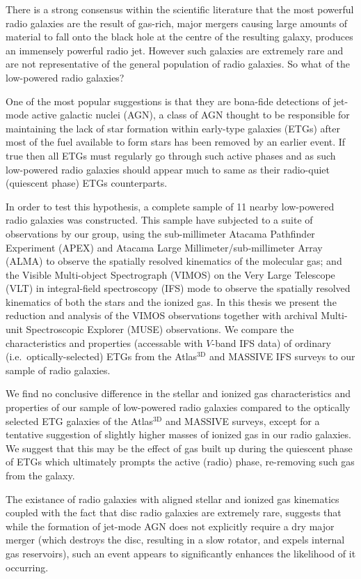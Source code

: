 \begin{abstractlong}
There is a strong consensus within the scientific literature that the most powerful radio galaxies are the result of gas-rich, major mergers causing large amounts of material to fall onto the black hole at the centre of the resulting galaxy, produces an immensely powerful radio jet. However such galaxies are extremely rare and are not representative of the general population of radio galaxies. So what of the low-powered radio galaxies? 

One of the most popular suggestions is that they are bona-fide detections of jet-mode active galactic nuclei (AGN), a class of AGN thought to be responsible for maintaining the lack of star formation within early-type galaxies (ETGs) after most of the fuel available to form stars has been removed by an earlier event. If true then all ETGs must regularly go through such active phases and as such low-powered radio galaxies should appear much to same as their radio-quiet (quiescent phase) ETGs counterparts. 

In order to test this hypothesis, a complete sample of 11 nearby low-powered radio galaxies was constructed. This sample have subjected to a suite of observations by our group, using the sub-millimeter Atacama Pathfinder Experiment (APEX) and Atacama Large Millimeter/sub-millimeter Array (ALMA) to observe the spatially resolved kinematics of the molecular gas; and the Visible Multi-object Spectrograph (VIMOS) on the Very Large Telescope (VLT) in integral-field spectroscopy (IFS) mode to observe the spatially resolved kinematics of both the stars and the ionized gas. In this thesis we present the reduction and analysis of the VIMOS observations together with archival Multi-unit Spectroscopic Explorer (MUSE) observations. We compare the characteristics and properties (accessable with $V$-band IFS data) of ordinary (i.e.\ optically-selected) ETGs from the Atlas$^\text{3D}$ and MASSIVE IFS surveys to our sample of radio galaxies.

We find no conclusive difference in the stellar and ionized gas characteristics and properties of our sample of low-powered radio galaxies compared to the optically selected ETG galaxies of the Atlas$^\text{3D}$ and MASSIVE surveys, except for a tentative suggestion of slightly higher masses of ionized gas in our radio galaxies. We suggest that this may be the effect of gas built up during the quiescent phase of ETGs which ultimately prompts the active (radio) phase, re-removing such gas from the galaxy.

The existance of radio galaxies with aligned stellar and ionized gas kinematics coupled with the fact that disc radio galaxies are extremely rare, suggests that while the formation of jet-mode AGN does not explicitly require a dry major merger (which destroys the disc, resulting in a slow rotator, and expels internal gas reservoirs), such an event appears to significantly enhances the likelihood of it occurring. 
\end{abstractlong}